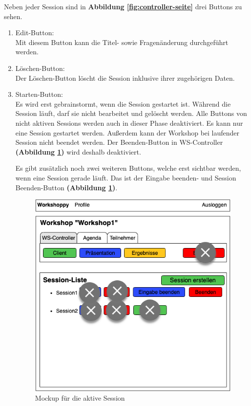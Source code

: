 \newpage
Neben jeder Session sind in \textbf{Abbildung \ref{fig:controller-seite}} drei Buttons zu sehen. 
\begin{enumerate}
\item Edit-Button:\\
Mit diesem Button kann die Titel- sowie Fragenänderung durchgeführt werden.
\item Löschen-Button:\\
Der Löschen-Button löscht die Session inklusive ihrer zugehörigen Daten.
\item Starten-Button:\\
Es wird erst \glqq gebrainstormt\grqq{}, wenn die Session gestartet ist. Während die Session läuft, darf sie nicht bearbeitet und gelöscht werden. Alle Buttons von nicht aktiven Sessions werden auch in dieser Phase deaktiviert. Es kann nur eine Session gestartet werden. Außerdem kann der Workshop bei laufender Session nicht beendet werden. Der \glqq Beenden\grqq{}-Button in WS-Controller \textbf{(Abbildung \ref{fig:mockup für die aktive session})} wird deshalb deaktiviert.\bigskip

Es gibt zusätzlich noch zwei weiteren Buttons, welche erst sichtbar werden, wenn eine Session gerade läuft. Das ist der \glqq Eingabe beenden\grqq{}- und \glqq Session Beenden\grqq{}-Button \textbf{(Abbildung \ref{fig:mockup für die aktive session})}.

\begin{figure}[H]
  \begin{center}
    \includegraphics[scale=0.45]{img/session_ist_gestartet}
	\caption{Mockup für die aktive Session}  
	\label{fig:mockup für die aktive session}
  \end{center}   
\end{figure}


\end{enumerate}
